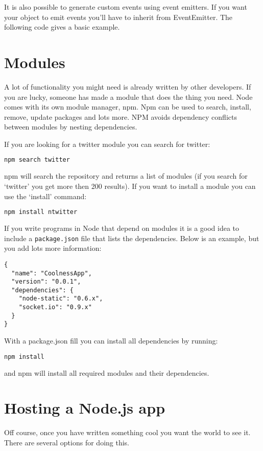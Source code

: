 \documentclass[a4paper]{report}
\begin{document}


\noindent It is also possible to generate custom events using event emitters. If you want your object to emit events you'll have to inherit from EventEmitter. The following code gives a basic example.



\section*{Modules}
A lot of functionality you might need is already written by other developers. If you are lucky, someone has made a module that does the thing you need. Node comes with its own module manager, npm. Npm can be used to search, install, remove, update packages and lots more. NPM avoids dependency conflicts between modules by nesting dependencies.

If you are looking for a twitter module you can search for twitter:
\begin{lstlisting}[language=bash]
npm search twitter
\end{lstlisting}
npm will search the repository and returns a list of modules (if you search for `twitter' you get more then 200 results). If you want to install a module you can use the `install' command: 
\begin{lstlisting}[language=bash]
npm install ntwitter
\end{lstlisting}

\noindent If you write programs in Node that depend on modules it is a good idea to include a \texttt{package.json} file that lists the dependencies. Below is an example, but you add lots more information:
\begin{lstlisting}
{
  "name": "CoolnessApp",
  "version": "0.0.1",
  "dependencies": {
    "node-static": "0.6.x",
    "socket.io": "0.9.x"
  }
}
\end{lstlisting}

\noindent With a package.json fill you can install all dependencies by running:
\begin{lstlisting}[language=bash]
npm install
\end{lstlisting}
\noindent and npm will install all required modules and their dependencies.

\section*{Hosting a Node.js app}
Off course, once you have written something cool you want the world to see it. There are several options for doing this.
\end{document}
